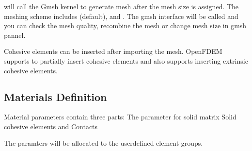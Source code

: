 \documentclass[letterpaper,10pt,english]{sphinxmanual}
\begin{document}
 will call the Gmsh kernel to generate mesh after the mesh size is assigned. The meshing scheme includes  (default),
 and  . The gmsh interface will be called and you can check the mesh quality, recombine the mesh or change mesh size in gmsh pannel.

\begin{sphinxVerbatim}[commandchars=\\\{\}]
 
\end{sphinxVerbatim}

Cohesive elements can be inserted after importing the mesh. OpenFDEM supports to partially insert cohesive elements and also supports inserting extrinsic cohesive elements.

\begin{sphinxVerbatim}[commandchars=\\\{\}]
 
\end{sphinxVerbatim}


\subsection{Materials Definition}
\label{\detokenize{rst_tutorials/tutorial1_ucs:materials-definition}}
Material parameters contain three parts:
\sphinxhyphen{} The parameter for solid matrix
\sphinxhyphen{} Solid cohesive elements and
\sphinxhyphen{} Contacts

The paramters will be allocated to the user\sphinxhyphen{}defined element groups.
\end{document}
